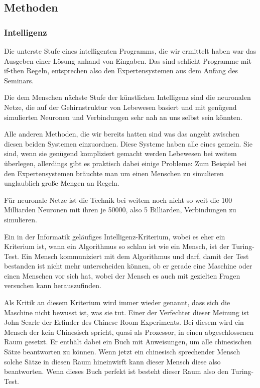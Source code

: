 \subsection{Methoden}
\subsubsection{Intelligenz}
Die unterste Stufe eines intelligenten Programms, die wir ermittelt haben war das Ausgeben einer Lösung anhand von Eingaben.
Das sind schlicht Programme mit if-then Regeln, entsprechen also den Expertensystemen aus dem Anfang des Seminars.

Die dem Menschen nächste Stufe der künstlichen Intelligenz sind die neuronalen Netze, die auf der Gehirnstruktur von Lebewesen basiert und mit genügend simulierten Neuronen und Verbindungen sehr nah an uns selbst sein könnten.

Alle anderen Methoden, die wir bereits hatten sind was das angeht zwischen diesen beiden Systemen einzuordnen.
Diese Systeme haben alle eines gemein.
Sie sind, wenn sie genügend kompliziert gemacht werden Lebewesen bei weitem überlegen, allerdings gibt es praktisch dabei einige Probleme: Zum Beispiel bei den Expertensystemen bräuchte man um einen Menschen zu simulieren unglaublich große Mengen an Regeln.

Für neuronale Netze ist die Technik bei weitem noch nicht so weit die 100 Milliarden Neuronen mit ihren je 50000, also 5 Billiarden, Verbindungen zu simulieren.

Ein in der Informatik geläufiges Intelligenz-Kriterium, wobei es eher ein Kriterium ist, wann ein Algorithmus so schlau ist wie ein Mensch, ist der Turing-Test.
Ein Mensch kommuniziert mit dem Algorithmus und darf, damit der Test bestanden ist nicht mehr unterscheiden können, ob er gerade eine Maschine oder einen Menschen vor sich hat, wobei der Mensch es auch mit gezielten Fragen versuchen kann herauszufinden.


Als Kritik an diesem Kriterium wird immer wieder genannt, dass sich die Maschine nicht bewusst ist, was sie tut.
Einer der Verfechter dieser Meinung ist John Searle der Erfinder des Chinese-Room-Experiments.
Bei diesem wird ein Mensch der kein Chinesisch spricht, quasi als Prozessor, in einen abgeschlossenen Raum gesetzt.
Er enthält dabei ein Buch mit Anweisungen, um alle chinesischen Sätze beantworten zu können.
Wenn jetzt ein chinesisch sprechender Mensch solche Sätze in diesen Raum hineinwirft kann dieser Mensch diese also beantworten.
Wenn dieses Buch perfekt ist besteht dieser Raum also den Turing-Test.


